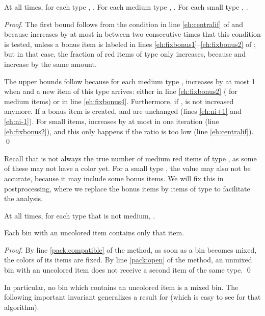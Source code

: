 \begin{aproperty}
\label{prop:redok}
At all times, for each type , .
For each medium type , .
For each small type , .
\end{aproperty}
\begin{proof}
The first bound follows from the condition in line \ref{eh:centralif} of {\EHarm} and because  increases by at most  in between two consecutive times that this condition is tested, unless a bonus item is labeled in lines \ref{eh:fixbonus1}--\ref{eh:fixbonus2} of {\EHarm}; but in that case, the fraction of red items of type  only increases, because
 and  increase by the same amount.

The upper bounds follow because for each medium type ,  increases by at most 1 when  and a new item of this type arrives: either in line \ref{eh:fixbonus2} ( for medium items) or in
line \ref{eh:fixbonus4}. Furthermore, if ,  is not increased anymore.
If a bonus item is created,  and  are unchanged (lines \ref{eh:ni+1} and \ref{eh:ni-1}).
For small items,  increases by at most  in one iteration (line \ref{eh:fixbonus2}), and this only happens if the ratio is too low (line \ref{eh:centralif}).
\qed\end{proof}

Recall that  is not always the true number of medium red items of type , as some of these may not have a color yet.
For a small type , the value  may also not be accurate, because it may include some bonus items. We will fix this in postprocessing, where we replace the bonus items by items of type  to facilitate the analysis.

\begin{aproperty}
At all times, for each type  that is not medium, .
\end{aproperty}

\begin{aproperty}
\label{prop:nocolor}
Each bin with an uncolored item contains only that item.
\end{aproperty}
\begin{proof}
By line \ref{pack:compatible} of the {\Pack} method, as soon as a bin becomes mixed, the colors of its items are fixed. 
By line \ref{pack:open} of the {\Pack} method, an unmixed bin with an uncolored item does not receive a second item of the same type.
\qed
\end{proof}

In particular, no bin which contains an uncolored item is a mixed bin.
The following important invariant generalizes a result for {\SuperH}
(which is easy to see for that algorithm).

